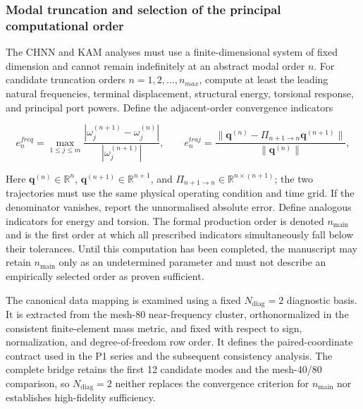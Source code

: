 \subsubsection{Modal truncation and selection of the principal computational order}\label{sec:galerkin-2-10-3}

The CHNN and KAM analyses must use a finite-dimensional system of fixed dimension and cannot remain indefinitely at an abstract modal order \(n\). For candidate truncation orders \(n = 1,2,\ldots,n_{max}\), compute at least the leading natural frequencies, terminal displacement, structural energy, torsional response, and principal port powers. Define the adjacent-order convergence indicators

\begin{equation}
\label{eq:galerkin-2-115}
e_{n}^{freq} = \max_{1 \leq j \leq m}\frac{\left| \omega_{j}^{(n + 1)} - \omega_{j}^{(n)} \right|}{\left| \omega_{j}^{(n + 1)} \right|},\quad\quad e_{n}^{traj} = \frac{\parallel \mathbf{q}^{(n)} - \Pi_{n + 1 \rightarrow n}\mathbf{q}^{(n + 1)} \parallel}{\parallel \mathbf{q}^{(n)} \parallel},
\end{equation}

Here \(\mathbf{q}^{(n)}\in\mathbb{R}^{n}\), \(\mathbf{q}^{(n+1)}\in\mathbb{R}^{n+1}\), and \(\Pi_{n+1\rightarrow n}\in\mathbb{R}^{n\times(n+1)}\); the two trajectories must use the same physical operating condition and time grid. If the denominator vanishes, report the unnormalised absolute error. Define analogous indicators for energy and torsion. The formal production order is denoted \(n_{\mathrm{main}}\) and is the first order at which all prescribed indicators simultaneously fall below their tolerances. Until this computation has been completed, the manuscript may retain \(n_{\mathrm{main}}\) only as an undetermined parameter and must not describe an empirically selected order as proven sufficient.

The canonical data mapping is examined using a fixed \(N_{\mathrm{diag}}=2\) diagnostic basis. It is extracted from the mesh-80 near-frequency cluster, orthonormalized in the consistent finite-element mass metric, and fixed with respect to sign, normalization, and degree-of-freedom row order. It defines the paired-coordinate contract used in the P1 series and the subsequent consistency analysis. The complete bridge retains the first 12 candidate modes and the mesh-40/80 comparison, so \(N_{\mathrm{diag}}=2\) neither replaces the convergence criterion for \(n_{\mathrm{main}}\) nor establishes high-fidelity sufficiency.

